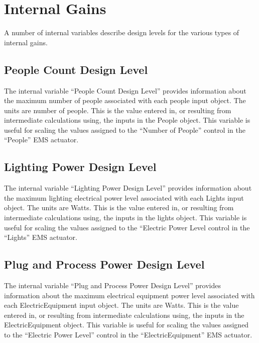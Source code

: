\section{Internal Gains}\label{internal-gains}

A number of internal variables describe design levels for the various types of internal gains.

\subsection{People Count Design Level}\label{people-count-design-level}

The internal variable ``People Count Design Level'' provides information about the maximum number of people associated with each people input object. The units are number of people. This is the value entered in, or resulting from intermediate calculations using, the inputs in the People object. This variable is useful for scaling the values assigned to the ``Number of People'' control in the ``People'' EMS actuator.

\subsection{Lighting Power Design Level}\label{lighting-power-design-level}

The internal variable ``Lighting Power Design Level'' provides information about the maximum lighting electrical power level associated with each Lights input object. The units are Watts. This is the value entered in, or resulting from intermediate calculations using, the inputs in the lights object. This variable is useful for scaling the values assigned to the ``Electric Power Level control in the ``Lights'' EMS actuator.

\subsection{Plug and Process Power Design Level}\label{plug-and-process-power-design-level}

The internal variable ``Plug and Process Power Design Level'' provides information about the maximum electrical equipment power level associated with each ElectricEquipment input object. The units are Watts. This is the value entered in, or resulting from intermediate calculations using, the inputs in the ElectricEquipment object. This variable is useful for scaling the values assigned to the ``Electric Power Level'' control in the ``ElectricEquipment'' EMS actuator.

